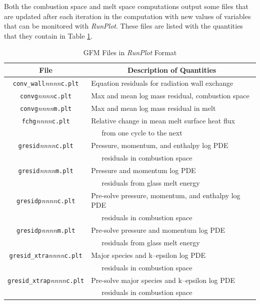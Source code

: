 \documentclass[12pt,twoside]{article}
\newcommand{\cfile}[2]{\texttt{#1}\textit{nnnn}\texttt{#2}}
\newcommand{\prog}[1]{\textsl{#1}}
\numberwithin{equation}{section}
\begin{document}
Both the combustion space and melt space computations output some files that are updated  after each iteration in the computation with new values of variables that can be monitored with \prog{RunPlot}. These files are listed with the quantities that they contain in Table \ref{runplot-files}.
\begin{table}[!ht]
  \caption{GFM Files in \prog{RunPlot} Format} 
  \vspace{2.mm}
  \label{runplot-files}
	\centering
		\begin{tabular}{|c|l|}
			\hline
      File & \multicolumn{1}{c|}{Description of Quantities} \\
      \hline
			\cfile{conv\_wall}{c.plt}  & Equation residuals for radiation wall exchange \\
			\cfile{convg}{c.plt}  & Max and mean log mass residual, combustion space \\
			\cfile{convg}{m.plt}  & Max and mean log mass residual in melt \\
      \cfile{fchg} {c.plt}  & Relative change in mean melt surface heat flux \\
                            & ~~~from one cycle to the next \\                           
			\cfile{gresid}{c.plt}  & Pressure, momentum, and enthalpy log PDE\\
			                       & ~~~residuals in combustion space \\
			\cfile{gresid}{m.plt}  & Pressure and momentum log PDE\\
			                       & ~~~residuals from glass melt energy \\
			\cfile{gresidp}{c.plt}  & Pre-solve pressure, momentum, and enthalpy log PDE\\
			                        & ~~~residuals in combustion space \\
			\cfile{gresidp}{m.plt}  & Pre-solve pressure and momentum log PDE\\
			                       & ~~~residuals from glass melt energy \\
			\cfile{gresid\_xtra}{c.plt}  & Major species and k--epsilon log PDE\\
			                             & ~~~residuals in combustion space \\
			\cfile{gresid\_xtrap}{c.plt}  & Pre-solve major species and k--epsilon log PDE\\
			                             & ~~~residuals in combustion space \\

\end{tabular}
\end{table}
\end{document}
